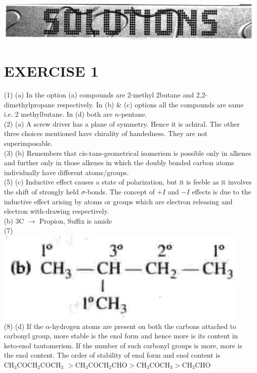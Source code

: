 \documentclass[10pt]{article}
\begin{document}
\begin{center}
\includegraphics[max width=\textwidth]{2025_01_28_8470952b98110cec3aabg-157(1)}
\end{center}

\section*{EXERCISE 1}
(1) (a) In the option (a) compounds are 2-methyl 2butane and 2,2-dimethylpropane respectively. In (b) \& (c) options all the compounds are same i.e. 2 methylbutane. In (d) both are $n$-pentane.\\
(2) (a) A screw driver has a plane of symmetry. Hence it is achiral. The other three choices mentioned have chirality of handedness. They are not superimposable.\\
(3) (b) Remembers that cis-tans-geometrical isomerism is possible only in alkenes and further only in those alkenes in which the doubly bonded carbon atoms individually have different atoms/groups.\\
(5) (c) Inductive effect causes a state of polarization, but it is feeble as it involves the shift of strongly held $\sigma$-bonds. The concept of $+I$ and $-I$ effects is due to the inductive effect arising by atoms or groups which are electron releasing and electron with-drawing respectively.\\
(b) 3C $\rightarrow$ Propion, Suffix is amide\\
(7)\\
\includegraphics[max width=\textwidth, center]{2025_01_28_8470952b98110cec3aabg-157}\\
(8) (d) If the $\alpha$-hydrogen atoms are present on both the carbons attached to carbonyl group, more stable is the enol form and hence more is its content in keto-enol tautomerism. If the number of such carbonyl groups is more, more is the enol content. The order of stability of enol form and enol content is $\mathrm{CH}_{3} \mathrm{COCH}_{2} \mathrm{COCH}_{3}$ $>\mathrm{CH}_{3} \mathrm{COCH}_{2} \mathrm{CHO}>\mathrm{CH}_{3} \mathrm{COCH}_{3}>\mathrm{CH}_{3} \mathrm{CHO}$\\
\end{document}
